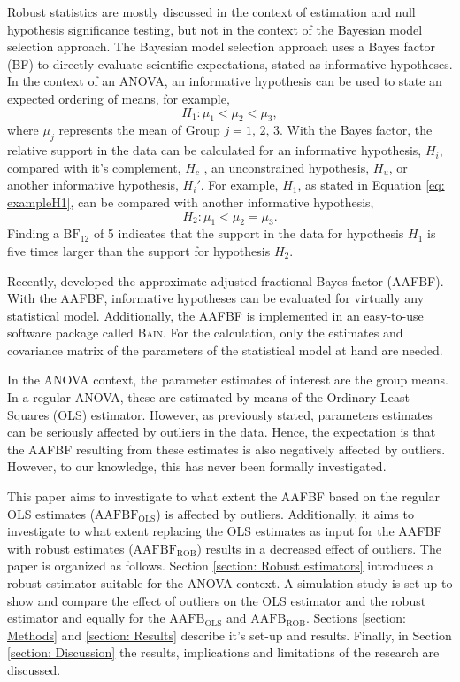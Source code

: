 \documentclass[11pt, a4paper]{article}
\begin{document}
Robust statistics are mostly discussed in the context of estimation and null hypothesis significance testing, but not in the context of the Bayesian model selection approach. 
The Bayesian model selection approach \citep*{Klugkist2005} uses a Bayes factor (BF) to directly evaluate scientific expectations, stated as informative hypotheses. 
In the context of an ANOVA, an informative hypothesis can be used to state an expected ordering of means, for example, 
\begin{equation}
H_1: \mu_1 < \mu_2 < \mu_3,
\label{eq: exampleH1}
\end{equation}
where $\mu_j$ represents the mean of Group $j = 1, \, 2, \, 3$. 
With the Bayes factor, the relative support in the data can be calculated for an informative hypothesis, $H_i$, compared with it's complement, $H_c$ \citep*{Rossum2013}, an unconstrained hypothesis, $H_u$, or another informative hypothesis, $H_i'$. 
For example, $H_1$, as stated in Equation \ref{eq: exampleH1}, can be compared with another informative hypothesis,
\begin{equation}
H_2: \mu_1 < \mu_2 = \mu_3.
\end{equation}
Finding a $\mathrm{BF}_{12}$ of 5 indicates that the support in the data for hypothesis $H_1$ is five times larger than the support for hypothesis $H_2$. 

Recently, \citet*{Gu2017} developed the approximate adjusted fractional Bayes factor (AAFBF).
With the AAFBF, informative hypotheses can be evaluated for virtually any statistical model. 
Additionally, the AAFBF is implemented in an easy-to-use software package called \textsc{Bain}. 
For the calculation, only the estimates and covariance matrix of the parameters of the statistical model at hand are needed. 

In the ANOVA context, the parameter estimates of interest are the group means.
In a regular ANOVA, these are estimated by means of the Ordinary Least Squares (OLS) estimator. 
However, as previously stated, parameters estimates can be seriously affected by outliers in the data. 
Hence, the expectation is that the AAFBF resulting from these estimates is also negatively affected by outliers. 
However, to our knowledge, this has never been formally investigated.

This paper aims to investigate to what extent the AAFBF based on the regular OLS estimates ($\mathrm{AAFBF_{OLS}}$) is affected by outliers.
Additionally, it aims to investigate to what extent replacing the OLS estimates as input for the AAFBF with robust estimates ($\mathrm{AAFBF_{ROB}}$) results in a decreased effect of outliers. 
The paper is organized as follows. 
Section \ref{section: Robust estimators} introduces a robust estimator suitable for the ANOVA context.
A simulation study is set up to show and compare the effect of outliers on the OLS estimator and the robust estimator and equally for the $\mathrm{AAFB_{OLS}}$ and $\mathrm{AAFB_{ROB}}$.
Sections \ref{section: Methods} and \ref{section: Results} describe it's set-up and results.
Finally, in Section \ref{section: Discussion} the results, implications and limitations of the research are discussed. 
\end{document}
